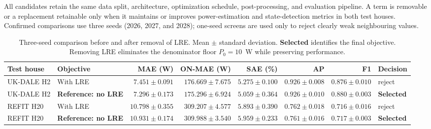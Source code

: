 \documentclass[conference]{IEEEtran}
\newcommand{\selected}[1]{\textbf{#1}}
\begin{document}
All candidates retain the same data split, architecture, optimization schedule, post-processing, and evaluation pipeline. A term is removable or a replacement retainable only when it maintains or improves power-estimation and state-detection metrics in both test houses. Confirmed comparisons use three seeds (2026, 2027, and 2028); one-seed screens are used only to reject clearly weak neighbouring values.

\begin{table}[!t]
\caption{Three-seed comparison before and after removal of LRE. Mean $\pm$ standard deviation. \selected{Selected} identifies the final objective. Removing LRE eliminates the denominator floor $P_0=10$~W while preserving performance.}
\label{tab:appendix-lre}
\centering\scriptsize
\begin{tabular}{llrrrrrl}
\toprule
Test house & Objective & MAE (W) & ON-MAE (W) & SAE (\%) & AP & F1 & Decision \\
\midrule
UK-DALE H2 & With LRE & $7.451\pm0.091$ & $176.669\pm7.675$ & $5.275\pm0.100$ & $0.926\pm0.008$ & $0.876\pm0.010$ & reject \\
UK-DALE H2 & \selected{Reference: no LRE} & $7.296\pm0.173$ & $175.296\pm6.924$ & $5.059\pm0.364$ & $0.926\pm0.010$ & $0.880\pm0.003$ & \selected{Selected} \\
REFIT H20 & With LRE & $10.798\pm0.355$ & $309.207\pm4.577$ & $5.893\pm0.390$ & $0.762\pm0.018$ & $0.716\pm0.016$ & reject \\
REFIT H20 & \selected{Reference: no LRE} & $10.931\pm0.174$ & $309.988\pm3.540$ & $5.959\pm0.233$ & $0.761\pm0.016$ & $0.717\pm0.003$ & \selected{Selected} \\
\bottomrule
\end{tabular}
\end{table}
\end{document}
